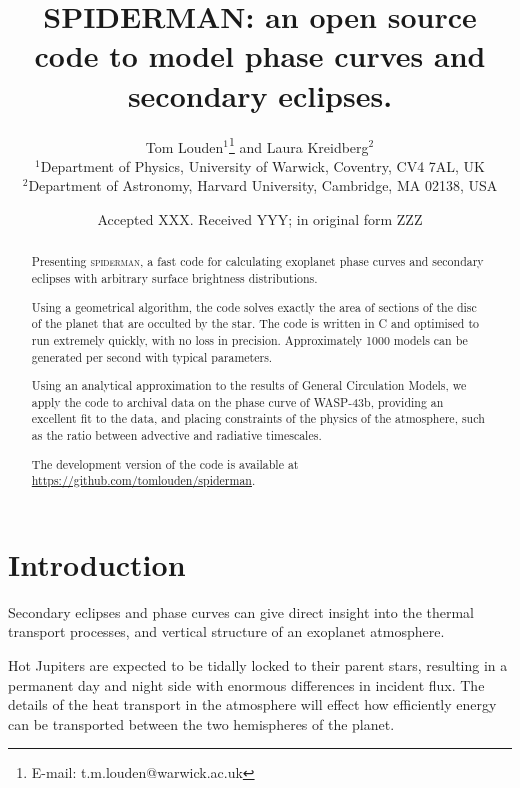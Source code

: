 \documentclass[a4paper,fleqn,usenatbib]{mnras}
\title[SPIDERMAN]{SPIDERMAN: an open source code to model phase curves and secondary eclipses.}
\author[T. Louden, L. Kreidberg]{Tom Louden$^{1}$\thanks{E-mail: t.m.louden@warwick.ac.uk} and Laura Kreidberg$^{2}$\\
$^{1}$Department of Physics, University of Warwick, Coventry, CV4 7AL, UK\\
$^{2}$Department of Astronomy, Harvard University, Cambridge, MA 02138, USA}
\date{Accepted XXX. Received YYY; in original form ZZZ}
\begin{document}
\label{firstpage}
\pagerange{\pageref{firstpage}--\pageref{lastpage}}
\maketitle

\begin{abstract}

Presenting \textsc{spiderman}, a fast code for calculating exoplanet phase curves and secondary eclipses with arbitrary surface brightness distributions.

Using a geometrical algorithm, the code solves exactly the area of sections of the disc of the planet that are occulted by the star. The code is written in C and optimised to run extremely quickly, with no loss in precision. Approximately 1000 models can be generated per second with typical parameters.

Using an analytical approximation to the results of General Circulation Models, we apply the code to archival data on the phase curve of WASP-43b, providing an excellent fit to the data, and placing constraints of the physics of the atmosphere, such as the ratio between advective and radiative timescales.

The development version of the code is available at \url{https://github.com/tomlouden/spiderman}.

\end{abstract}

\begin{keywords}
\end{keywords}



\section{Introduction}\label{sec:introduction}

Secondary eclipses and phase curves can give direct insight into the thermal transport processes, and vertical structure of an exoplanet atmosphere.

Hot Jupiters are expected to be tidally locked to their parent stars, resulting in a permanent day and night side with enormous differences in incident flux. The details of the heat transport in the atmosphere will effect how efficiently energy can be transported between the two hemispheres of the planet.
\end{document}
